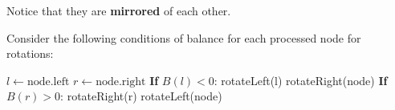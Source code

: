 \begin{theorem}
    Notice that they are \textbf{mirrored} of each other.

    Consider the following conditions of balance for each processed node for rotations:
    \begin{algorithmic}
        \State $l \gets \text{node.left}$
        \State $r \gets \text{node.right}$
        \State \textbf{If} $B(l) < 0$: rotateLeft(l)
        \State rotateRight(node)
        \EndIf
        \State \textbf{If} $B(r) > 0$: rotateRight(r)
        \State rotateLeft(node)
        \EndIf
    \end{algorithmic}
\end{theorem}